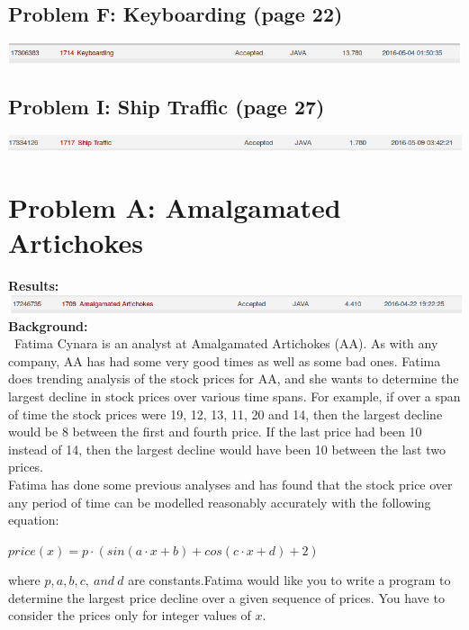 \documentclass[12pt]{article}
\begin{document}
\subsection{Problem F: Keyboarding (page 22)}
\includegraphics[width=\textwidth]{ProblemF}
\subsection{Problem I: Ship Traffic (page 27)}
\includegraphics[width=\textwidth]{ProblemI}
\newpage


\section{Problem A: Amalgamated Artichokes}
\noindent \textbf{Results:} \\

\includegraphics[width=\textwidth]{ProblemA} \\

\noindent \textbf{Background:} \\
~\indent Fatima Cynara is an analyst at Amalgamated Artichokes (AA). As with any company, AA has had some
very good times as well as some bad ones. Fatima does trending analysis of the stock prices for AA, and she
wants to determine the largest decline in stock prices over various time spans. For example, if over a span
of time the stock prices were 19, 12, 13, 11, 20 and 14, then the largest decline would be 8 between the first
and fourth price. If the last price had been 10 instead of 14, then the largest decline would have been 10
between the last two prices. \\
\indent Fatima has done some previous analyses and has found that the stock price over any period of time can
be modelled reasonably accurately with the following equation:
\begin{center}$price(x) = p \cdot (sin(a\cdot x + b) + cos(c\cdot x + d) + 2)$\end{center}
where $p,a,b,c,\ and\ d$ are constants.Fatima would like you to write a program to determine the largest
price decline over a given sequence of prices. You have to consider the prices only for integer values of $x$. \\
\end{document}

